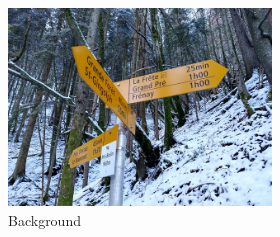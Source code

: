 \begin{figure}[]
\begin{subfigure}{\textwidth}
        \begin{subfigure}{0.2\textwidth}
            \centering
            \includegraphics[width=\textwidth]{images/04-experiment02/photo/bg.jpg}
            \caption*{Background}
        \end{subfigure}
        \hfill
        \begin{subfigure}{0.78\textwidth}
            \centering
            \begin{subfigure}{0.32\textwidth}
                \centering
\end{subfigure}
\end{subfigure}
\end{subfigure}
\end{figure}
